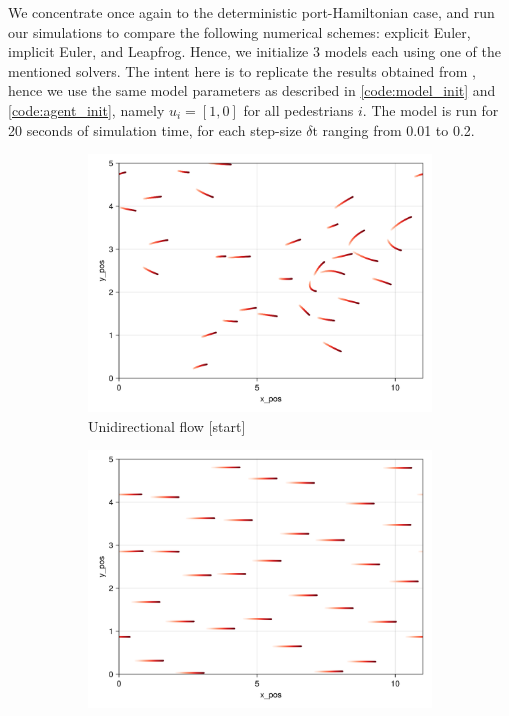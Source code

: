 We concentrate once again to the deterministic port-Hamiltonian case, and run our simulations to compare the following numerical schemes: explicit Euler, implicit Euler, and Leapfrog. Hence, we initialize 3 models each using one of the mentioned solvers. The intent here is to replicate the results obtained from \cite{tordeux2022multi}, hence we use the same model parameters as described in \autoref{code:model_init} and \autoref{code:agent_init}, namely $u_i = [1,0]$ for all pedestrians $i$. The model is run for 20 seconds of simulation time, for each step-size $\delta \text{t}$ ranging from 0.01 to 0.2.


\begin{figure}[H]
    \centering
    \begin{subfigure}{.49\textwidth}
        \centering
        \includegraphics[width=\linewidth]{figures/Uniflowdflow_101.png}
        \caption{Unidirectional flow [start]}
    \end{subfigure}
    \begin{subfigure}{.49\textwidth}
        \centering
        \includegraphics[width=\linewidth]{figures/Uniflowdflow_4000.png}

\end{subfigure}
\end{figure}
